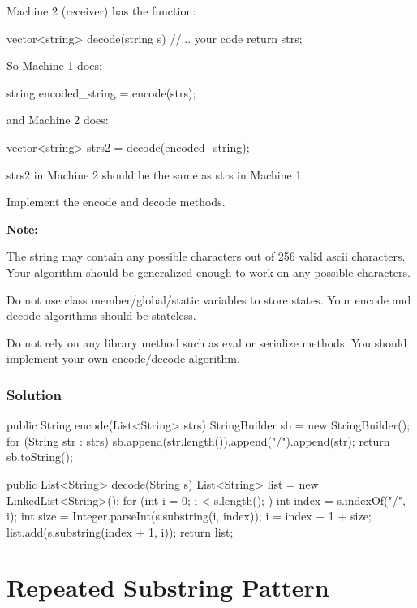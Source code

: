 Machine 2 (receiver) has the function:

\begin{Code}
vector<string> decode(string s) {
  //... your code
  return strs;
}
\end{Code}

So Machine 1 does:

\begin{Code}
string encoded_string = encode(strs);
\end{Code}

and Machine 2 does:

\begin{Code}
vector<string> strs2 = decode(encoded_string);
\end{Code}

strs2 in Machine 2 should be the same as strs in Machine 1.

Implement the encode and decode methods.

\textbf{Note:}

The string may contain any possible characters out of 256 valid ascii characters. Your algorithm should be generalized enough to work on any possible characters.

Do not use class member/global/static variables to store states. Your encode and decode algorithms should be stateless.

Do not rely on any library method such as eval or serialize methods. You should implement your own encode/decode algorithm.
\subsubsection{Solution}

\begin{Code}
public String encode(List<String> strs) {
    StringBuilder sb = new StringBuilder();
    for (String str : strs) {
        sb.append(str.length()).append("/").append(str);
    }
    return sb.toString();
}

public List<String> decode(String s) {
    List<String> list = new LinkedList<String>();
    for (int i = 0; i < s.length(); ) {
        int index = s.indexOf("/", i);
        int size = Integer.parseInt(s.substring(i, index));
        i = index + 1 + size;
        list.add(s.substring(index + 1, i));
    }
    return list;
}
\end{Code}

\newpage

\section{Repeated Substring Pattern} %

